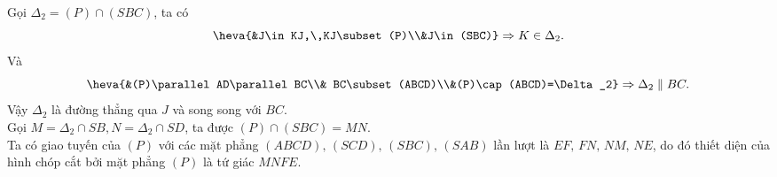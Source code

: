 \begin{bt}
{\begin{listEX}
			Gọi $\Delta_2=(P)\cap(SBC)$, ta có
			$$\heva{&J\in KJ,\,KJ\subset (P)\\&J\in (SBC)}\Rightarrow K \in \Delta_2.$$
			Và	
			$$\heva{&(P)\parallel AD\parallel BC\\& BC\subset (ABCD)\\&(P)\cap (ABCD)=\Delta_2}\Rightarrow \Delta_2 \parallel BC.$$
			Vậy $\Delta_2$ là đường thẳng qua $J$ và song song với $BC$.\\
			Gọi $M=\Delta_2 \cap SB, N=\Delta_2 \cap SD$, ta được $(P)\cap (SBC)=MN$.\\
			Ta có giao tuyến của $(P)$ với các mặt phẳng $(ABCD),\,(SCD),\,(SBC),\,(SAB)$ lần lượt là $EF,\,FN,\,NM,\,NE$, do đó thiết diện của hình chóp cắt bởi mặt phẳng $(P)$ là tứ giác $MNFE$.
		\end{listEX}
	}
\end{bt}

